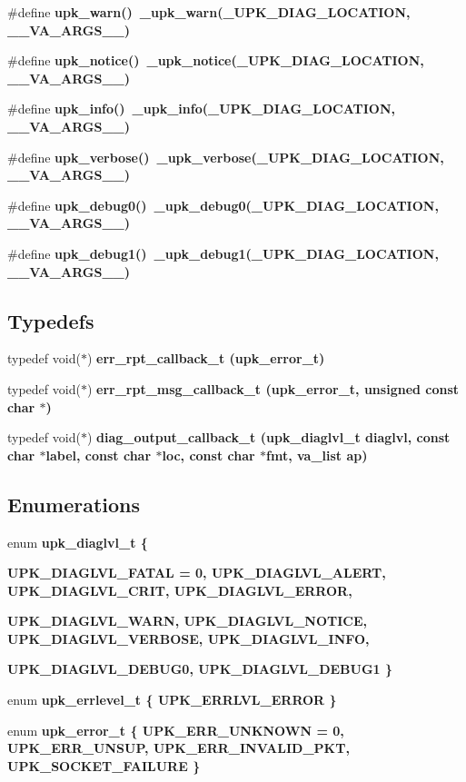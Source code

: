 \begin{CompactItemize}
\#define \bf{upk\_\-warn}()~\_\-upk\_\-warn(\_\-UPK\_\-DIAG\_\-LOCATION, \_\-\_\-VA\_\-ARGS\_\-\_\-)
\item 
\#define \bf{upk\_\-notice}()~\_\-upk\_\-notice(\_\-UPK\_\-DIAG\_\-LOCATION, \_\-\_\-VA\_\-ARGS\_\-\_\-)
\item 
\#define \bf{upk\_\-info}()~\_\-upk\_\-info(\_\-UPK\_\-DIAG\_\-LOCATION, \_\-\_\-VA\_\-ARGS\_\-\_\-)
\item 
\#define \bf{upk\_\-verbose}()~\_\-upk\_\-verbose(\_\-UPK\_\-DIAG\_\-LOCATION, \_\-\_\-VA\_\-ARGS\_\-\_\-)
\item 
\#define \bf{upk\_\-debug0}()~\_\-upk\_\-debug0(\_\-UPK\_\-DIAG\_\-LOCATION, \_\-\_\-VA\_\-ARGS\_\-\_\-)
\item 
\#define \bf{upk\_\-debug1}()~\_\-upk\_\-debug1(\_\-UPK\_\-DIAG\_\-LOCATION, \_\-\_\-VA\_\-ARGS\_\-\_\-)
\end{CompactItemize}
\subsection*{Typedefs}
\begin{CompactItemize}
\item 
typedef void($\ast$) \bf{err\_\-rpt\_\-callback\_\-t} (\bf{upk\_\-error\_\-t})
\item 
typedef void($\ast$) \bf{err\_\-rpt\_\-msg\_\-callback\_\-t} (\bf{upk\_\-error\_\-t}, unsigned const char $\ast$)
\item 
typedef void($\ast$) \bf{diag\_\-output\_\-callback\_\-t} (\bf{upk\_\-diaglvl\_\-t} diaglvl, const char $\ast$label, const char $\ast$loc, const char $\ast$fmt, va\_\-list ap)
\end{CompactItemize}
\subsection*{Enumerations}
\begin{CompactItemize}
\item 
enum \bf{upk\_\-diaglvl\_\-t} \{ \par
\bf{UPK\_\-DIAGLVL\_\-FATAL} =  0, 
\bf{UPK\_\-DIAGLVL\_\-ALERT}, 
\bf{UPK\_\-DIAGLVL\_\-CRIT}, 
\bf{UPK\_\-DIAGLVL\_\-ERROR}, 
\par
\bf{UPK\_\-DIAGLVL\_\-WARN}, 
\bf{UPK\_\-DIAGLVL\_\-NOTICE}, 
\bf{UPK\_\-DIAGLVL\_\-VERBOSE}, 
\bf{UPK\_\-DIAGLVL\_\-INFO}, 
\par
\bf{UPK\_\-DIAGLVL\_\-DEBUG0}, 
\bf{UPK\_\-DIAGLVL\_\-DEBUG1}
 \}
\item 
enum \bf{upk\_\-errlevel\_\-t} \{ \bf{UPK\_\-ERRLVL\_\-ERROR}
 \}
\item 
enum \bf{upk\_\-error\_\-t} \{ \bf{UPK\_\-ERR\_\-UNKNOWN} =  0, 
\bf{UPK\_\-ERR\_\-UNSUP}, 
\bf{UPK\_\-ERR\_\-INVALID\_\-PKT}, 
\bf{UPK\_\-SOCKET\_\-FAILURE}
 \}
\end{CompactItemize}
